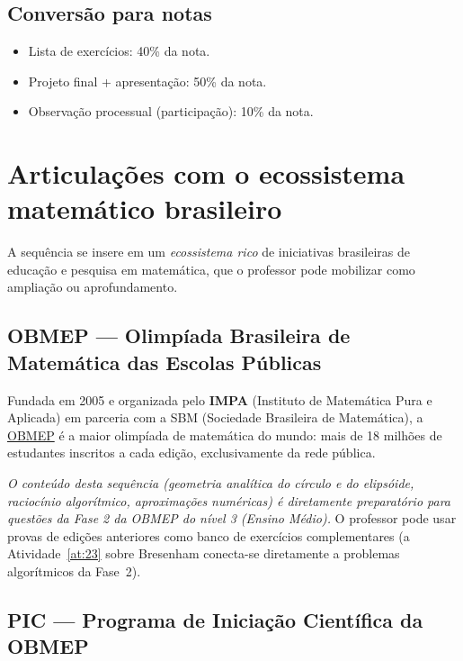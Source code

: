 \documentclass[12pt,a4paper]{scrartcl}
\newcommand{\acc}[1]{\textcolor{accent}{\textbf{#1}}}
\begin{document}
\subsection{Conversão para notas}
\begin{itemize}[leftmargin=1.3em,itemsep=0.1em,topsep=0.2em,nosep]
  \item Lista de exercícios: 40\% da nota.
  \item Projeto final + apresentação: 50\% da nota.
  \item Observação processual (participação): 10\% da nota.
\end{itemize}

\section{Articulações com o ecossistema matemático brasileiro}\label{sec:obmep}

A sequência se insere em um \emph{ecossistema rico} de iniciativas brasileiras de educação e pesquisa em matemática, que o professor pode mobilizar como ampliação ou aprofundamento.

\subsection{OBMEP --- Olimpíada Brasileira de Matemática das Escolas Públicas}

Fundada em 2005 e organizada pelo \acc{IMPA} (Instituto de Matemática Pura e Aplicada) em parceria com a SBM (Sociedade Brasileira de Matemática), a \href{https://www.obmep.org.br/}{OBMEP} é a maior olimpíada de matemática do mundo: mais de 18 milhões de estudantes inscritos a cada edição, exclusivamente da rede pública.

\emph{O conteúdo desta sequência (geometria analítica do círculo e do elipsóide, raciocínio algorítmico, aproximações numéricas) é diretamente preparatório para questões da Fase 2 da OBMEP do nível 3 (Ensino Médio).} O professor pode usar provas de edições anteriores como banco de exercícios complementares (a Atividade~\ref{at:23} sobre Bresenham conecta-se diretamente a problemas algorítmicos da Fase~2).

\subsection{PIC --- Programa de Iniciação Científica da OBMEP}
\end{document}
